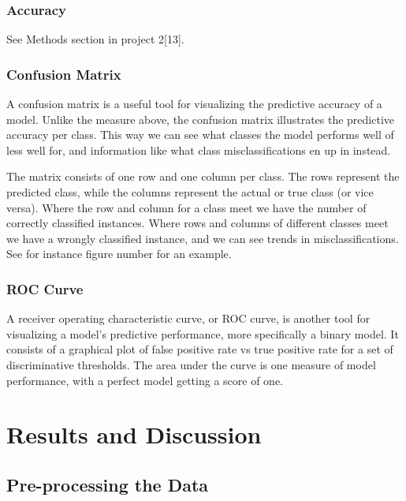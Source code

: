 \documentclass[11pt]{article}
\begin{document}
\hypertarget{accuracy}{%
\subsubsection{Accuracy}\label{accuracy}}
See Methods section in project 2[13].
\hypertarget{confusion-matrix}{%
\subsubsection{Confusion Matrix}\label{confusion-matrix}}
A confusion matrix is a useful tool for visualizing the predictive accuracy of a model. Unlike the measure above, the confusion matrix illustrates the predictive accuracy per class. This way we can see what classes the model performs well of less well for, and information like what class misclassifications en up in instead.

The matrix consists of one row and one column per class. The rows represent the predicted class, while the columns represent the actual or true class (or vice versa). Where the row and column for a class meet we have the number of correctly classified instances. Where rows and columns of different classes meet we have a wrongly classified instance, and we can see trends in misclassifications. See for instance figure number for an example. 

\hypertarget{roc-curve}{%
\subsubsection{ROC Curve}\label{roc-curve}}
A receiver operating characteristic curve, or ROC curve, is another tool for visualizing a model's predictive performance, more specifically a binary model. It consists of a graphical plot of false positive rate vs true positive rate for a set of discriminative thresholds. The area under the curve is one measure of model performance, with a perfect model getting a score of one.

\hypertarget{results-and-discussion}{%
\section{Results and Discussion}\label{results-and-discussion}}

    \hypertarget{pre-processing-the-data}{%
\subsection{Pre-processing the Data}\label{pre-processing-the-data}}
\end{document}
